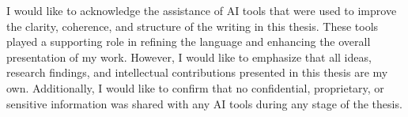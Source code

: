 I would like to acknowledge the assistance of AI tools that were used to improve the clarity, coherence, and structure of the writing in this thesis.
These tools played a supporting role in refining the language and enhancing the overall presentation of my work.
However, I would like to emphasize that all ideas, research findings, and intellectual contributions presented in this thesis are my own.
Additionally, I would like to confirm that no confidential, proprietary, or sensitive information was shared with any AI tools during any stage of the thesis.
